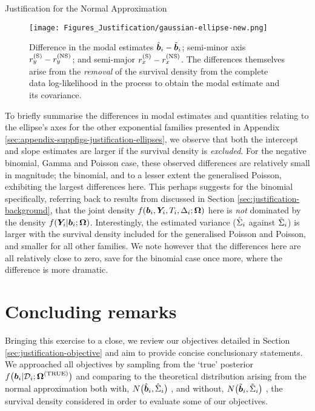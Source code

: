 \begin{chapter}{\label{cha:justification}Justification for the Normal Approximation}
  \begin{figure}[ht]
      \centering
      \texttt{[image: Figures\_Justification/gaussian-ellipse-new.png]}
      \caption{Difference in the modal estimates $\hat{\bm{b}}_i-\tilde{\bm{b}}_i$; semi-minor axis $r_y^{(\mathrm{S})}-r_y^{(\mathrm{NS})}$; and semi-major $r_x^{(\mathrm{S})}-r_x^{(\mathrm{NS})}$. The differences themselves arise from the \textit{removal} of the survival density from the complete data log-likelihood in the process to obtain the modal estimate and its covariance.}
      \label{fig:justification-ellipse-gaussian}
  \end{figure}

  To briefly summarise the differences in modal estimates and quantities relating to the ellipse's axes for the other exponential families presented in Appendix \ref{sec:appendix-suppfigs-justification-ellipses}, we observe that both the intercept and slope estimates are larger if the survival density is \textit{excluded}. For the negative binomial, Gamma and Poisson case, these observed differences are relatively small in magnitude; the binomial, and to a lesser extent the generalised Poisson, exhibiting the largest differences here. This perhaps suggests for the binomial specifically, referring back to results from \citet{Rizopoulos2012} discussed in Section \ref{sec:justification-background}, that the joint density $f\!\left(\bm{b}_i,\bm{Y}_i,T_i,\Delta_i;\bm{\mathrm{\Omega}}\right)$ here is \textit{not} dominated by the density $f\!\left(\bm{Y}_i|\bm{b}_i;\bm{\mathrm{\Omega}}\right)$. \newline 
  Interestingly, the estimated variance (\ie $\hat{\Sigma}_i$ against $\tilde{\Sigma}_i$) is larger with the survival density included for the generalised Poisson and Poisson, and smaller for all other families. We note however that the differences here are all relatively close to zero, save for the binomial case once more, where the difference is more dramatic.

  \section{Concluding remarks}\label{sec:justification-conclusion}
  Bringing this exercise to a close, we review our objectives detailed in Section \ref{sec:justification-objective} and aim to provide concise conclusionary statements. We approached all objectives by sampling from the `true' posterior $f\big(\bm{b}_i|\mathcal{D}_i;\bm{\mathrm{\Omega}}^{(\mathrm{TRUE})}\big)$ and comparing to the theoretical distribution arising from the normal approximation both with, $N\big(\hat{\bm{b}}_i,\hat{\Sigma}_i\big)$ \citep{Bernhardt15, Murray2022, Murray2023}, and without, $N\big(\tilde{\bm{b}}_i,\tilde{\Sigma}_i\big)$ \citep{Rizopoulos2012}, the survival density considered in order to evaluate some of our objectives.


\end{chapter}
